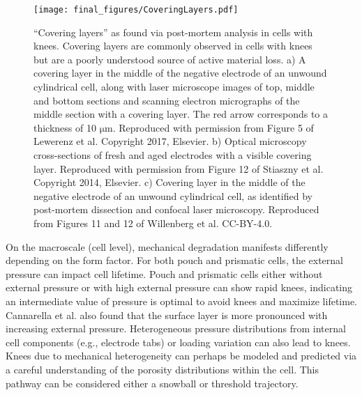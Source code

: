\documentclass[journal=jpclcd,manuscript=article]{achemso}
\begin{document}
\begin{figure}[ht!]
\centering
\texttt{[image: final\_figures/CoveringLayers.pdf]}
\caption{``Covering layers'' as found via post-mortem analysis in cells with knees. Covering layers are commonly observed in cells with knees but are a poorly understood source of active material loss.
a) A covering layer in the middle of the negative electrode of an unwound cylindrical cell, along with laser microscope images of top, middle and bottom sections and scanning electron micrographs of the middle section with a covering layer. The red arrow corresponds to a thickness of 10 $\mathrm{\mu m}$. Reproduced with permission from Figure 5 of Lewerenz et al. \cite{lewerenz_post-mortem_2017} Copyright 2017, Elsevier. b) Optical microscopy cross-sections of fresh and aged electrodes with a visible covering layer. Reproduced with permission from Figure 12 of Stiaszny et al. \cite{stiaszny_electrochemical_2014} Copyright 2014, Elsevier. c) Covering layer in the middle of the negative electrode of an unwound cylindrical cell, as identified by post-mortem dissection and confocal laser microscopy. Reproduced from Figures 11 and 12 of Willenberg et al.\cite{willenberg_development_2020} CC-BY-4.0.} 
\label{fig:covering_layers}
\end{figure}

On the macroscale (cell level), mechanical degradation manifests differently depending on the form factor. For both pouch and prismatic cells, the external pressure can impact cell lifetime. Pouch and prismatic cells either without external pressure\cite{wunsch_investigation_2019} or with high external pressure\cite{cannarella_stress_2014} can show rapid knees, indicating an intermediate value of pressure is optimal to avoid knees and maximize lifetime. Cannarella et al.\cite{cannarella_stress_2014} also found that the surface layer is more pronounced with increasing external pressure. Heterogeneous pressure distributions from internal cell components (e.g., electrode tabs) or loading variation\cite{beck_inhomogeneities_2021} can also lead to knees. Knees due to mechanical heterogeneity can perhaps be modeled and predicted via a careful understanding of the porosity distributions within the cell. This pathway can be considered either a snowball or threshold trajectory.
\end{document}
